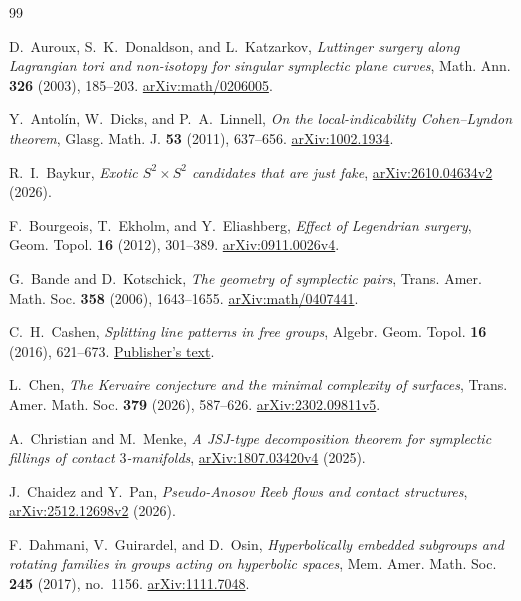 \documentclass[11pt]{amsart}
\theoremstyle{definition}
\theoremstyle{remark}
\begin{document}
\begin{thebibliography}{99}

D.~Auroux, S.~K.~Donaldson, and L.~Katzarkov,
\emph{Luttinger surgery along Lagrangian tori and non-isotopy for
singular symplectic plane curves}, Math. Ann. \textbf{326} (2003),
185--203. \href{https://arxiv.org/abs/math/0206005}{arXiv:math/0206005}.

Y.~Antol\'in, W.~Dicks, and P.~A.~Linnell,
\emph{On the local-indicability Cohen--Lyndon theorem},
Glasg. Math. J. \textbf{53} (2011), 637--656.
\href{https://arxiv.org/abs/1002.1934}{arXiv:1002.1934}.

R.~I.~Baykur, \emph{Exotic $S^2\times S^2$ candidates that are just fake},
\href{https://arxiv.org/abs/2610.04634v2}{arXiv:2610.04634v2} (2026).

F.~Bourgeois, T.~Ekholm, and Y.~Eliashberg,
\emph{Effect of Legendrian surgery}, Geom. Topol. \textbf{16}
(2012), 301--389.
\href{https://arxiv.org/abs/0911.0026v4}{arXiv:0911.0026v4}.

G.~Bande and D.~Kotschick, \emph{The geometry of symplectic pairs},
Trans. Amer. Math. Soc. \textbf{358} (2006), 1643--1655.
\href{https://arxiv.org/abs/math/0407441}{arXiv:math/0407441}.

C.~H.~Cashen, \emph{Splitting line patterns in free groups},
Algebr. Geom. Topol. \textbf{16} (2016), 621--673.
\href{https://msp.org/agt/2016/16-2/agt-v16-n2-p01-s.pdf}{Publisher's text}.

L.~Chen, \emph{The Kervaire conjecture and the minimal complexity of
surfaces}, Trans. Amer. Math. Soc. \textbf{379} (2026), 587--626.
\href{https://arxiv.org/abs/2302.09811v5}{arXiv:2302.09811v5}.

A.~Christian and M.~Menke, \emph{A JSJ-type decomposition theorem for
symplectic fillings of contact $3$-manifolds},
\href{https://arxiv.org/abs/1807.03420v4}{arXiv:1807.03420v4} (2025).

J.~Chaidez and Y.~Pan, \emph{Pseudo-Anosov Reeb flows and contact
structures}, \href{https://arxiv.org/abs/2512.12698v2}{arXiv:2512.12698v2}
(2026).

F.~Dahmani, V.~Guirardel, and D.~Osin, \emph{Hyperbolically embedded
subgroups and rotating families in groups acting on hyperbolic spaces},
Mem. Amer. Math. Soc. \textbf{245} (2017), no.~1156.
\href{https://arxiv.org/abs/1111.7048}{arXiv:1111.7048}.


\end{thebibliography}
\end{document}
